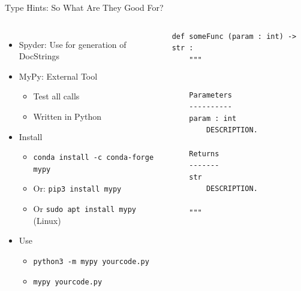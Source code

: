 
\begin{frame}[fragile]{Type Hints: So What Are They Good For?}
%
\vspace{-15pt}
\begin{columns}[t]
\begin{itemize}
\item Spyder: Use for generation of DocStrings
\item MyPy: External Tool
	\begin{itemize}
	\item Test all calls
	\item Written in Python
	\end{itemize}
\item Install
	\begin{itemize}
	\item \texttt{conda install -c conda-forge mypy}
	\item Or: \texttt{pip3 install mypy}
	\item Or \texttt{sudo apt install mypy} (Linux)
	\end{itemize}
\item Use
	\begin{itemize}
	\item \texttt{python3 -m mypy yourcode.py}
	\item \texttt{mypy yourcode.py}
	\end{itemize}
\end{itemize}
%
\begin{codebox}
\begin{verbatim}
def someFunc (param : int) -> str :
    """


    Parameters
    ----------
    param : int
        DESCRIPTION.

    Returns
    -------
    str 
        DESCRIPTION.

    """
\end{verbatim}
\end{codebox}
\end{columns}
%
\end{frame}


